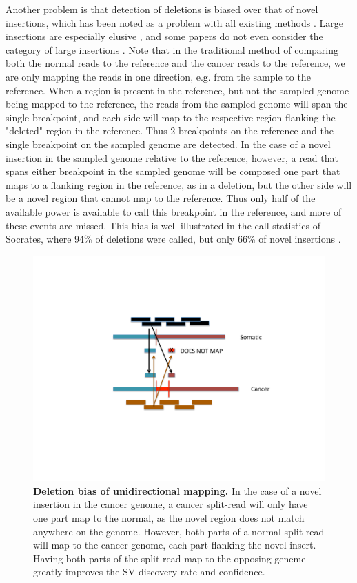 \documentclass{easychithesis}
\begin{document}
Another problem is that detection of deletions is biased over that of novel insertions, which has been noted as a problem with all existing methods \cite{lee2008robust, medvedev2009computational, jiang2012prism, abel2013detection, alkan2011genome}. Large insertions are especially elusive \cite{abel2013detection}, and some papers do not even consider the category of large insertions \cite{jiang2012prism}. Note that in the traditional method of comparing both the normal reads to the reference and the cancer reads to the reference, we are only mapping the reads in one direction, e.g. from the sample to the reference. When a region is present in the reference, but not the sampled genome being mapped to the reference, the reads from the sampled genome will span the single breakpoint, and each side will map to the respective region flanking the "deleted" region in the reference. Thus 2 breakpoints on the reference and the single breakpoint on the sampled genome are detected. In the case of a novel insertion in the sampled genome relative to the reference, however, a read that spans either breakpoint in the sampled genome will be composed one part that maps to a flanking region in the reference, as in a deletion, but the other side will be a novel region that cannot map to the reference. Thus only half of the available power is available to call this breakpoint in the reference, and more of these events are missed. This bias is well illustrated in the call statistics of Socrates, where 94\% of deletions were called, but only 66\% of novel insertions \cite{schroder2014socrates}.

\begin{figure}[!ht]
\begin{center}
\includegraphics[width = 0.95  \linewidth]{../Code/Figures/DeletionBias.pdf}
\end{center}
\caption{{\bf Deletion bias of unidirectional mapping.} In the case of a novel insertion in the cancer genome, a cancer split-read will only have one part map to the normal, as the novel region does not match anywhere on the genome. However, both parts of a normal split-read will map to the cancer genome, each part flanking the novel insert. Having both parts of the split-read map to the opposing geneme greatly improves the SV discovery rate and confidence.}
\label{fig:DeletionBias}
\end{figure}
\end{document}

